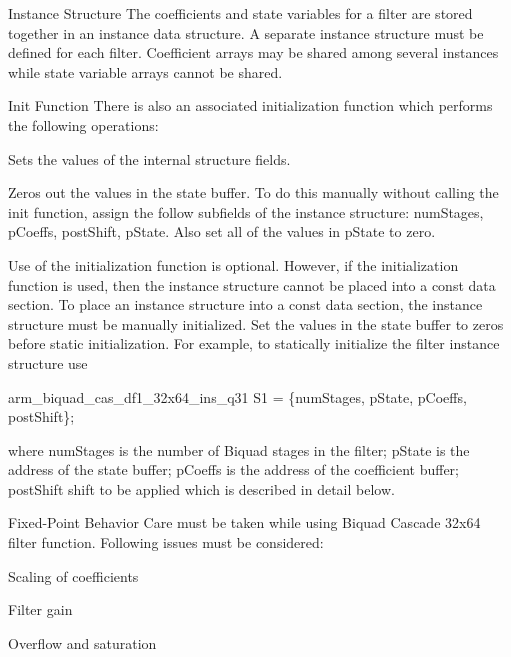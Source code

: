 \begin{DoxyParagraph}{Instance Structure}
The coefficients and state variables for a filter are stored together in an instance data structure. A separate instance structure must be defined for each filter. Coefficient arrays may be shared among several instances while state variable arrays cannot be shared.
\end{DoxyParagraph}
\begin{DoxyParagraph}{Init Function}
There is also an associated initialization function which performs the following operations\+:
\begin{DoxyItemize}
\item Sets the values of the internal structure fields.
\item Zeros out the values in the state buffer. To do this manually without calling the init function, assign the follow subfields of the instance structure\+: num\+Stages, p\+Coeffs, post\+Shift, p\+State. Also set all of the values in p\+State to zero.
\end{DoxyItemize}
\end{DoxyParagraph}
\begin{DoxyParagraph}{}
Use of the initialization function is optional. However, if the initialization function is used, then the instance structure cannot be placed into a const data section. To place an instance structure into a const data section, the instance structure must be manually initialized. Set the values in the state buffer to zeros before static initialization. For example, to statically initialize the filter instance structure use 
\begin{DoxyPre}
    arm\_biquad\_cas\_df1\_32x64\_ins\_q31 S1 = \{numStages, pState, pCoeffs, postShift\};
\end{DoxyPre}
 where {\ttfamily num\+Stages} is the number of Biquad stages in the filter; {\ttfamily p\+State} is the address of the state buffer; {\ttfamily p\+Coeffs} is the address of the coefficient buffer; {\ttfamily post\+Shift} shift to be applied which is described in detail below. 
\end{DoxyParagraph}
\begin{DoxyParagraph}{Fixed-\/\+Point Behavior}
Care must be taken while using Biquad Cascade 32x64 filter function. Following issues must be considered\+:
\begin{DoxyItemize}
\item Scaling of coefficients
\item Filter gain
\item Overflow and saturation
\end{DoxyItemize}
\end{DoxyParagraph}
